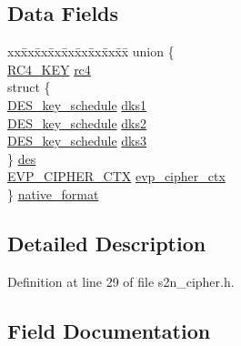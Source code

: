 \subsection*{Data Fields}
\begin{DoxyCompactItemize}
\item 
\begin{tabbing}
xx\=xx\=xx\=xx\=xx\=xx\=xx\=xx\=xx\=\kill
union \{\\
\>\hyperlink{crypto_2rc4_2rc4_8h_a3a4dc0099b3145020be0227ebf1ef71a}{RC4\_KEY} \hyperlink{structs2n__session__key_aac8b65d397508abc3246f33122cb88dc}{rc4}\\
\>struct \{\\
\>\>\hyperlink{crypto_2des_2des_8h_a524e0ff852070682aced151c7cfbfd83}{DES\_key\_schedule} \hyperlink{structs2n__session__key_adba02766741157515c73b59862642084}{dks1}\\
\>\>\hyperlink{crypto_2des_2des_8h_a524e0ff852070682aced151c7cfbfd83}{DES\_key\_schedule} \hyperlink{structs2n__session__key_a974b7c512f4618e979aa1dd8447aa6ba}{dks2}\\
\>\>\hyperlink{crypto_2des_2des_8h_a524e0ff852070682aced151c7cfbfd83}{DES\_key\_schedule} \hyperlink{structs2n__session__key_a0431655ea0f8f8b7ab1ee8d8f88171ba}{dks3}\\
\>\} \hyperlink{structs2n__session__key_ac2afaf05c666514cce529e894fd8bf87}{des}\\
\>\hyperlink{crypto_2ossl__typ_8h_aab2bd6a044e1d31ebc2fe82b3b0b3d9a}{EVP\_CIPHER\_CTX} \hyperlink{structs2n__session__key_af56d0d167801d35add7ff05bb974e3e1}{evp\_cipher\_ctx}\\
\} \hyperlink{structs2n__session__key_afe527615e6e7d852f53125597340db87}{native\_format}\\

\end{tabbing}\end{DoxyCompactItemize}


\subsection{Detailed Description}


Definition at line 29 of file s2n\+\_\+cipher.\+h.



\subsection{Field Documentation}
